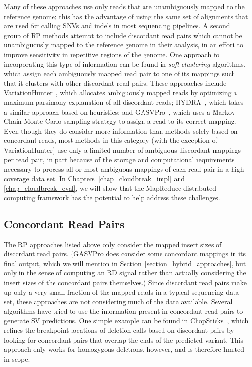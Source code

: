Many of these approaches use only reads that are unambiguously mapped to the reference genome; this has the advantage of using the same set of alignments that are used for calling SNVs and indels in most sequencing pipelines. A second group of RP methods attempt to include discordant read pairs which cannot be unambiguously mapped to the reference genome in their analysis, in an effort to improve sensitivity in repetitive regions of the genome. One approach to incorporating this type of information can be found in \emph{soft clustering} algorithms, which assign each ambiguously mapped read pair to one of its mappings such that it clusters with other discordant read pairs. These approaches include VariationHunter~\cite{Hormozdiari:2009p284}, which allocates ambiguously mapped reads by optimizing a maximum parsimony explanation of all discordant reads; HYDRA~\cite{Quinlan:2010gf}, which takes a similar approach based on heuristics; and GASVPro~\cite{Sindi:2012kk}, which uses a Markov-Chain Monte Carlo sampling strategy to assign a read to its correct mapping. Even though they do consider more information than methods solely based on concordant reads, most methods in this category (with the exception of VariationHunter) use only a limited number of ambiguous discordant mappings per read pair, in part because of the storage and computational requirements necessary to process all or most ambiguous mappings of each read pair in a high-coverage data set. In Chapters~\ref{chap_cloudbreak_impl} and \ref{chap_cloudbreak_eval}, we will show that the MapReduce distributed computing framework has the potential to help address these challenges.

\subsection{Concordant Read Pairs}\label{section_mixture_of_distributions}

The RP approaches listed above only consider the mapped insert sizes of discordant read pairs. (GASVPro does consider some concordant mappings in its final output, which we will mention in Section~\ref{section_hybrid_approaches}, but only in the sense of computing an RD signal rather than actually considering the insert sizes of the concordant pairs themselves.) Since discordant read pairs make up only a very small fraction of the mapped reads in a typical sequencing data set, these approaches are not considering much of the data available. Several algorithms have tried to use the information present in concordant read pairs to generate SV predictions. One simple example can be found in ChopSticks~\cite{Yasuda:2012ij}, which refines the breakpoint locations of deletion calls based on discordant pairs by looking for concordant pairs that overlap the ends of the predicted variant. This approach only works for homozygous deletions, however, and is therefore limited in scope.

